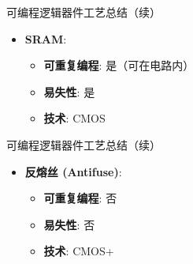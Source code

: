 \documentclass[
  ignorenonframetext,
  chinese,
]{beamer}
\providecommand{\tightlist}{%
  \setlength{\itemsep}{0pt}\setlength{\parskip}{0pt}}
\begin{document}
\begin{frame}
\begin{block}{可编程逻辑器件工艺总结（续）}
\begin{itemize}
\tightlist
\item
  \textbf{SRAM}:

  \begin{itemize}
  \tightlist
  \item
    \textbf{可重复编程}: 是（可在电路内）
  \item
    \textbf{易失性}: 是
  \item
    \textbf{技术}: CMOS
  \end{itemize}
\end{itemize}
\end{block}
\end{frame}

\begin{frame}
\begin{block}{可编程逻辑器件工艺总结（续）}
\begin{itemize}
\tightlist
\item
  \textbf{反熔丝 (Antifuse)}:

  \begin{itemize}
  \tightlist
  \item
    \textbf{可重复编程}: 否
  \item
    \textbf{易失性}: 否
  \item
    \textbf{技术}: CMOS+
  \end{itemize}
\end{itemize}
\end{block}
\end{frame}
\end{document}
